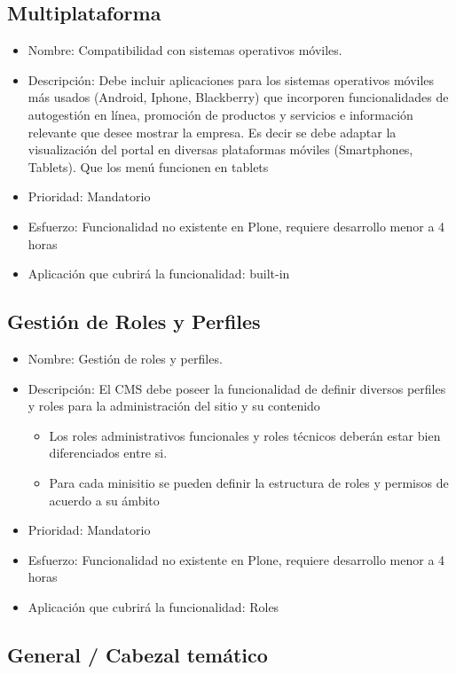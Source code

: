 \documentclass[11pt, letterpaper, oneside, spanish]{scrbook}
\begin{document}
\subsection{Multiplataforma}
\label{sec-2-1-15}

\begin{itemize}
\item Nombre: Compatibilidad con sistemas operativos móviles.
\item Descripción: Debe incluir aplicaciones para los sistemas operativos móviles
  más usados (Android, Iphone, Blackberry) que incorporen funcionalidades de
  autogestión en línea, promoción de productos y servicios e información
  relevante que desee mostrar la empresa. Es decir se debe adaptar la
  visualización del portal en diversas plataformas móviles (Smartphones,
  Tablets). Que los menú funcionen en tablets
\item Prioridad: Mandatorio
\item Esfuerzo: Funcionalidad no existente en Plone, requiere desarrollo menor a 4
  horas
\item Aplicación que cubrirá la funcionalidad:  built-in
\end{itemize}
\subsection{Gestión de Roles y Perfiles}
\label{sec-2-1-16}

\begin{itemize}
\item Nombre: Gestión de roles y perfiles.
\item Descripción: El CMS debe poseer la funcionalidad de definir diversos
  perfiles y roles para la administración del sitio y su contenido
\begin{itemize}
\item Los roles administrativos funcionales y roles técnicos deberán estar bien
    diferenciados entre si.
\item Para cada minisitio se pueden definir la estructura de roles y permisos de
    acuerdo a su ámbito
\end{itemize}
\item Prioridad: Mandatorio
\item Esfuerzo: Funcionalidad no existente en Plone, requiere desarrollo menor a 4
  horas
\item Aplicación que cubrirá la funcionalidad: Roles
\end{itemize}
\subsection{General / Cabezal temático}
\label{sec-2-1-17}
\end{document}
